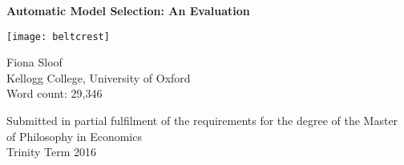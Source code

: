 \begin{titlepage}

  \begin{center}
        \vspace*{2cm}
        
        \Large
      
        \Large
       \textbf{Automatic Model Selection: An Evaluation}  \\ 
 
        \vspace{0.5cm}
        
        
        \vspace{2cm}
        
           \texttt{[image: beltcrest]}
        
         \vspace{2cm}
        
	Fiona Sloof\\
	Kellogg College, University of Oxford  \\
	Word count: 29,346
	      
        
   
       
        
        \vfill
        
        
        \vspace{0.8cm}
        
        
        \Large
       Submitted in partial fulfilment of the requirements for the degree of the Master of Philosophy in Economics\\

        Trinity Term 2016
        
        
        
    \end{center}

\end{titlepage}
